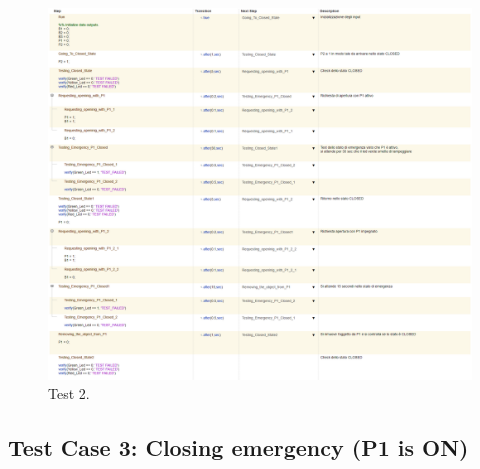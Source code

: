 \documentclass[12pt]{article}
\begin{document}
\begin{figure}[H]
    
    \hspace{-2.3cm} %
    \includegraphics[width=1.3\textwidth]{Immagini_Test/Test_2_img.PNG}
    \caption{Test 2.}
    \label{fig:Test_2}
\end{figure}

\subsection{Test Case 3: Closing emergency (P1 is ON)}
\end{document}

